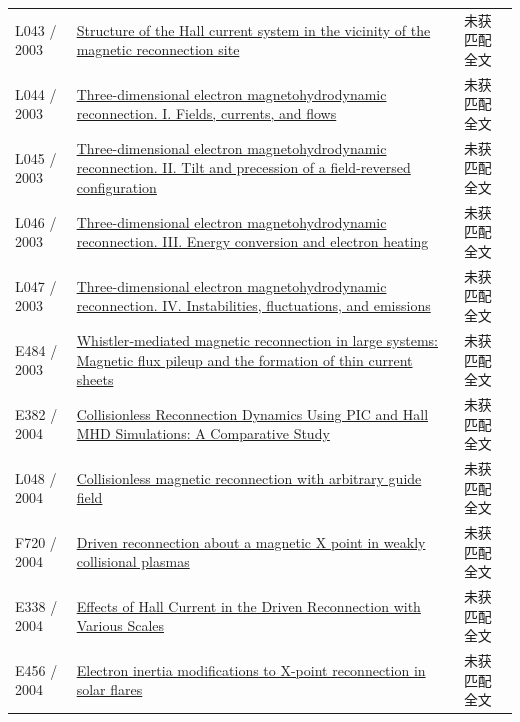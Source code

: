 \documentclass[UTF8,a4paper,11pt,openany,fontset=fandol]{ctexbook}
\begin{document}
\begin{longtable}{P{24mm}P{97mm}P{27mm}}
L043 / 2003 & \href{https://doi.org/10.1029/2003ja009900}{Structure of the Hall current system in the vicinity of the magnetic reconnection site} & 未获匹配全文\\

L044 / 2003 & \href{https://doi.org/10.1063/1.1578998}{Three-dimensional electron magnetohydrodynamic reconnection. I. Fields,  currents,  and flows} & 未获匹配全文\\

L045 / 2003 & \href{https://doi.org/10.1063/1.1578999}{Three-dimensional electron magnetohydrodynamic reconnection. II. Tilt and precession of a field-reversed configuration} & 未获匹配全文\\

L046 / 2003 & \href{https://doi.org/10.1063/1.1579000}{Three-dimensional electron magnetohydrodynamic reconnection. III. Energy conversion and electron heating} & 未获匹配全文\\

L047 / 2003 & \href{https://doi.org/10.1063/1.1579001}{Three-dimensional electron magnetohydrodynamic reconnection. IV. Instabilities,  fluctuations,  and emissions} & 未获匹配全文\\

E484 / 2003 & \href{https://doi.org/10.1029/2001ja009180}{Whistler‐mediated magnetic reconnection in large systems: Magnetic flux pileup and the formation of thin current sheets} & 未获匹配全文\\

E382 / 2004 & \href{https://ui.adsabs.harvard.edu/abs/2004APS..DPPBP1073B/abstract}{Collisionless Reconnection Dynamics Using PIC and Hall MHD Simulations: A Comparative Study} & 未获匹配全文\\

L048 / 2004 & \href{https://doi.org/10.1063/1.1791640}{Collisionless magnetic reconnection with arbitrary guide field} & 未获匹配全文\\

F720 / 2004 & \href{https://doi.org/10.1063/1.1796691}{Driven reconnection about a magnetic X point in weakly collisional plasmas} & 未获匹配全文\\

E338 / 2004 & \href{https://doi.org/10.1088/0256-307x/21/7/059}{Effects of Hall Current in the Driven Reconnection with Various Scales} & 未获匹配全文\\

E456 / 2004 & \href{http://ui.adsabs.harvard.edu/abs/2004cosp...35.1242M/abstract}{Electron inertia modifications to X-point reconnection in solar flares} & 未获匹配全文\\


\end{longtable}
\end{document}
